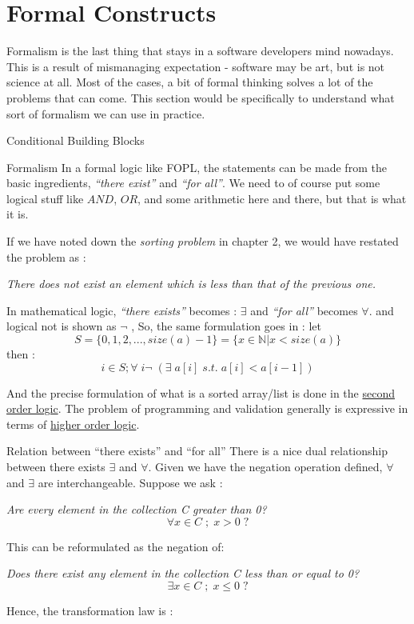 \chapter{Formal Constructs}\label{using-predicates}

{\LARGE F}ormalism is the last thing that stays in a software developers mind nowadays. This is a result of mismanaging expectation - software may be art, but is not science at all. Most of the cases, a bit of formal thinking solves a lot of the problems that can come.
This section would be specifically to understand what sort of formalism we can use in practice.

\begin{section}{Conditional Building Blocks}

\begin{subsection}{Formalism}
In a formal logic like FOPL, the statements can be made from the basic ingredients, 
\emph{``there exist''} and \emph{``for all''}. We need to of course put some logical stuff like $AND$, $OR$,
and some arithmetic here and there, but that is what it is.

If we have noted down the \emph{sorting problem} in chapter 2, we would have restated the problem as :

\begin{center}
\emph{ There does not exist an element which is less than that of the previous one. }
\end{center} 

In mathematical logic, \emph{``there exists''} becomes : $\exists$ and \emph{``for all''} becomes $\forall$.
and logical not is shown as $\neg$ ,  So, the same formulation goes in : let 
$$
S = \{ 0, 1, 2, ... , size(a)-1  \} =  \{  x \in \mathbb{N} | x < size(a) \} 
$$
then :
$$
  i \in S ; \forall \; i  \neg \; ( \exists \; a[i] \; s.t. \; a[i] < a[i-1]    ) 
$$ 

And the precise formulation of what is a sorted array/list is done in the 
\href{https://en.wikipedia.org/wiki/Second-order_logic}{second order logic}.
The problem of programming and validation generally is expressive in terms of 
\href{https://en.wikipedia.org/wiki/Higher-order_logic}{higher order logic}.
\end{subsection}
\begin{subsection}{Relation between ``there exists'' and ``for all'' }
There is a nice dual relationship between there exists $\exists$ and $\forall$.
Given we have the negation operation defined, $\forall$ and $\exists$  are interchangeable.
Suppose we ask :  
\begin{center}
\emph{ Are every element in the collection C greater than 0? }
$$
\forall x \in C \; ; \; x > 0 \; ?
$$
\end{center}
This can be reformulated as the negation of:
\begin{center}
\emph{ Does there exist any element in the collection C less than or equal to 0? }
$$
\exists x \in C \; ; \; x \le 0 \; ?
$$
\end{center}
Hence, the transformation law is :


\end{subsection}
\end{section}
